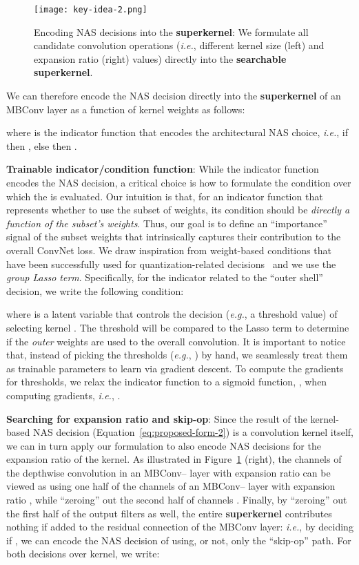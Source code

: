 \documentclass[runningheads]{llncs}
\begin{document}
\begin{figure}[h!]
  \centering
  \texttt{[image: key-idea-2.png]}
  \caption{Encoding NAS decisions into the \textbf{superkernel}: 
  We formulate all candidate convolution operations (\textit{i.e.},
  different kernel size (left) and expansion ratio (right) values) directly 
  into the \textbf{searchable superkernel}.}
  \label{fig:key_idea_2}
\end{figure}

We can therefore encode the NAS decision directly into the 
\textbf{superkernel} of an MBConv layer as a function of kernel weights
as follows:

where  is the indicator function that encodes the 
architectural NAS choice, \textit{i.e.}, if  then 
, else  then  
.

\textbf{Trainable indicator/condition function}: While the indicator function
encodes the NAS decision, a critical choice is how to formulate the condition over 
which the  is evaluated. Our intuition is that, for an 
indicator function that represents whether to use the subset of weights,
its condition should be \textit{directly a function of the subset's weights}. 
Thus, our goal is to define an ``importance'' signal of the subset
weights that intrinsically captures their contribution to the overall ConvNet
loss. We draw inspiration from weight-based conditions that have been 
successfully used for quantization-related 
decisions~\cite{ding2019flightnns} and we use 
the \textit{group Lasso term}. Specifically, for the indicator related to
the  ``outer shell'' decision, 
we write the following condition:

where  is a latent variable that controls the decision (\textit{e.g.},
a threshold value) of selecting kernel . The threshold will be compared to 
the Lasso term to determine if the \textit{outer}
 weights are used to the overall convolution.
It is important to notice that, instead of picking the thresholds (\textit{e.g.}, ) 
by hand, we seamlessly 
treat them as trainable parameters to learn via gradient descent. 
To compute the gradients for thresholds, we relax the indicator 
function  to a 
sigmoid function, , when computing gradients, \textit{i.e.}, 
. 


\textbf{Searching for expansion ratio and skip-op}: Since the result of the 
kernel-based NAS decision  (Equation~\ref{eq:proposed-form-2}) is a 
convolution kernel itself, we can in turn apply our formulation to also encode 
NAS decisions for the expansion ratio of the  kernel.
As illustrated in Figure~\ref{fig:key_idea_2} (right), the channels of the 
depthwise convolution in an MBConv-- layer with expansion ratio  
can be viewed as using one half of the channels of an 
MBConv-- layer with expansion ratio , while ``zeroing'' 
out the second half of channels .
Finally, by ``zeroing'' out the first half of the output filters as well, 
the entire \textbf{superkernel} contributes nothing if added to the 
residual connection of the MBConv layer: \textit{i.e.}, by deciding if ,
we can encode the NAS decision of using, or not, only the ``skip-op'' path. 
For both decisions over  kernel, we write:
\end{document}
